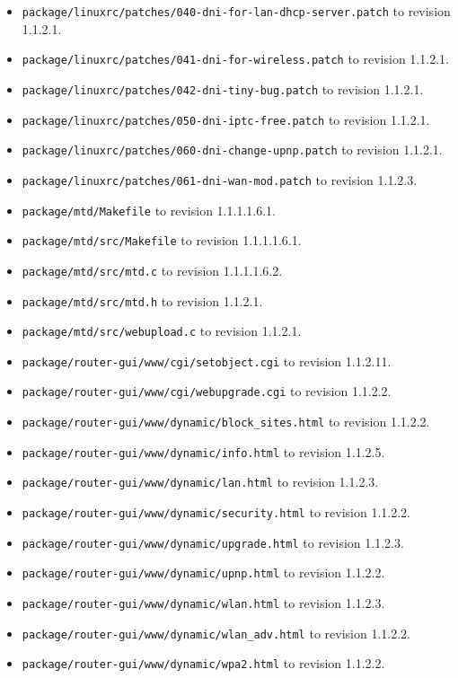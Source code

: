 \documentclass[12pt]{report}
\begin{document}
\begin{itemize}
\begin{enumerate}
\begin{itemize}
  \item \texttt{package/linuxrc/patches/040-dni-for-lan-dhcp-server.patch} to revision 1.1.2.1.
  \item \texttt{package/linuxrc/patches/041-dni-for-wireless.patch} to revision 1.1.2.1.
  \item \texttt{package/linuxrc/patches/042-dni-tiny-bug.patch} to revision 1.1.2.1.
  \item \texttt{package/linuxrc/patches/050-dni-iptc-free.patch} to revision 1.1.2.1.
  \item \texttt{package/linuxrc/patches/060-dni-change-upnp.patch} to revision 1.1.2.1.
  \item \texttt{package/linuxrc/patches/061-dni-wan-mod.patch} to revision 1.1.2.3.
  \item \texttt{package/mtd/Makefile} to revision 1.1.1.1.6.1.
  \item \texttt{package/mtd/src/Makefile} to revision 1.1.1.1.6.1.
  \item \texttt{package/mtd/src/mtd.c} to revision 1.1.1.1.6.2.
  \item \texttt{package/mtd/src/mtd.h} to revision 1.1.2.1.
  \item \texttt{package/mtd/src/webupload.c} to revision 1.1.2.1.
  \item \texttt{package/router-gui/www/cgi/setobject.cgi} to revision 1.1.2.11.
  \item \texttt{package/router-gui/www/cgi/webupgrade.cgi} to revision 1.1.2.2.
  \item \texttt{package/router-gui/www/dynamic/block\_sites.html} to revision 1.1.2.2.
  \item \texttt{package/router-gui/www/dynamic/info.html} to revision 1.1.2.5.
  \item \texttt{package/router-gui/www/dynamic/lan.html} to revision 1.1.2.3.
  \item \texttt{package/router-gui/www/dynamic/security.html} to revision 1.1.2.2.
  \item \texttt{package/router-gui/www/dynamic/upgrade.html} to revision 1.1.2.3.
  \item \texttt{package/router-gui/www/dynamic/upnp.html} to revision 1.1.2.2.
  \item \texttt{package/router-gui/www/dynamic/wlan.html} to revision 1.1.2.3.
  \item \texttt{package/router-gui/www/dynamic/wlan\_adv.html} to revision 1.1.2.2.
  \item \texttt{package/router-gui/www/dynamic/wpa2.html} to revision 1.1.2.2.

\end{itemize}
\end{enumerate}
\end{itemize}
\end{document}
